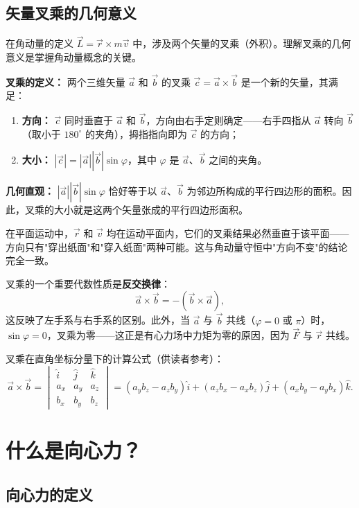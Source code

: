 \documentclass[12pt,a4paper]{article}
\begin{document}
\subsection{矢量叉乘的几何意义}

在角动量的定义 $\vec{L} = \vec{r} \times m\vec{v}$ 中，涉及两个矢量的叉乘（外积）。理解叉乘的几何意义是掌握角动量概念的关键。

\textbf{叉乘的定义：} 两个三维矢量 $\vec{a}$ 和 $\vec{b}$ 的叉乘 $\vec{c} = \vec{a} \times \vec{b}$ 是一个新的矢量，其满足：

\begin{enumerate}
  \item \textbf{方向：} $\vec{c}$ 同时垂直于 $\vec{a}$ 和 $\vec{b}$，方向由右手定则确定——右手四指从 $\vec{a}$ 转向 $\vec{b}$（取小于 $180^\circ$ 的夹角），拇指指向即为 $\vec{c}$ 的方向；
  \item \textbf{大小：} $|\vec{c}| = |\vec{a}||\vec{b}|\sin\varphi$，其中 $\varphi$ 是 $\vec{a}$、$\vec{b}$ 之间的夹角。
\end{enumerate}

\textbf{几何直观：} $|\vec{a}||\vec{b}|\sin\varphi$ 恰好等于以 $\vec{a}$、$\vec{b}$ 为邻边所构成的平行四边形的面积。因此，叉乘的大小就是这两个矢量张成的平行四边形面积。

在平面运动中，$\vec{r}$ 和 $\vec{v}$ 均在运动平面内，它们的叉乘结果必然垂直于该平面——方向只有"穿出纸面"和"穿入纸面"两种可能。这与角动量守恒中"方向不变"的结论完全一致。

叉乘的一个重要代数性质是\textbf{反交换律}：
\[
\vec{a} \times \vec{b} = -(\vec{b} \times \vec{a}),
\]
这反映了左手系与右手系的区别。此外，当 $\vec{a}$ 与 $\vec{b}$ 共线（$\varphi = 0$ 或 $\pi$）时，$\sin\varphi = 0$，叉乘为零——这正是有心力场中力矩为零的原因，因为 $\vec{F}$ 与 $\vec{r}$ 共线。

叉乘在直角坐标分量下的计算公式（供读者参考）：
\[
\vec{a} \times \vec{b}
= \begin{vmatrix}
\hat{i} & \hat{j} & \hat{k} \\
a_x & a_y & a_z \\
b_x & b_y & b_z
\end{vmatrix}
= (a_y b_z - a_z b_y)\hat{i}
  + (a_z b_x - a_x b_z)\hat{j}
  + (a_x b_y - a_y b_x)\hat{k}.
\]

\section{什么是向心力？}

\subsection{向心力的定义}
\end{document}
